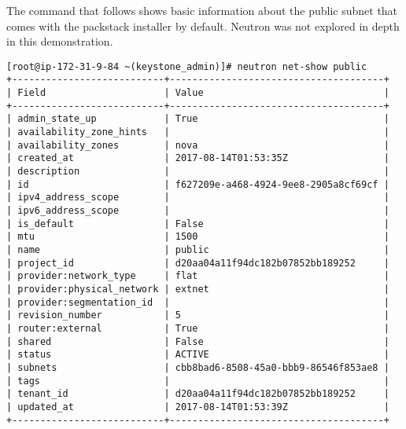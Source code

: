 The command that follows shows basic information about the public
subnet that comes with the packstack installer by default. Neutron was not
explored in depth in this demonstration.

\begin{verbatim}
[root@ip-172-31-9-84 ~(keystone_admin)]# neutron net-show public
+---------------------------+--------------------------------------+
| Field                     | Value                                |
+---------------------------+--------------------------------------+
| admin_state_up            | True                                 |
| availability_zone_hints   |                                      |
| availability_zones        | nova                                 |
| created_at                | 2017-08-14T01:53:35Z                 |
| description               |                                      |
| id                        | f627209e-a468-4924-9ee8-2905a8cf69cf |
| ipv4_address_scope        |                                      |
| ipv6_address_scope        |                                      |
| is_default                | False                                |
| mtu                       | 1500                                 |
| name                      | public                               |
| project_id                | d20aa04a11f94dc182b07852bb189252     |
| provider:network_type     | flat                                 |
| provider:physical_network | extnet                               |
| provider:segmentation_id  |                                      |
| revision_number           | 5                                    |
| router:external           | True                                 |
| shared                    | False                                |
| status                    | ACTIVE                               |
| subnets                   | cbb8bad6-8508-45a0-bbb9-86546f853ae8 |
| tags                      |                                      |
| tenant_id                 | d20aa04a11f94dc182b07852bb189252     |
| updated_at                | 2017-08-14T01:53:39Z                 |
+---------------------------+--------------------------------------+
\end{verbatim}
